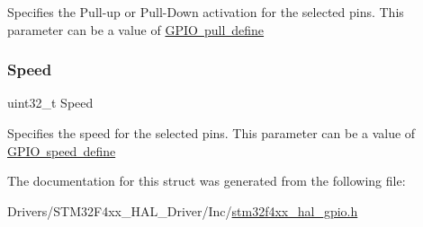 Specifies the Pull-\/up or Pull-\/\+Down activation for the selected pins. This parameter can be a value of \mbox{\hyperlink{group___g_p_i_o__pull__define}{G\+P\+IO pull define}} \mbox{\label{struct_g_p_i_o___init_type_def_ad04b2041f59d32492ec36a891418f3fd}} 
\subsubsection{\texorpdfstring{Speed}{Speed}}
{\footnotesize\ttfamily uint32\+\_\+t Speed}

Specifies the speed for the selected pins. This parameter can be a value of \mbox{\hyperlink{group___g_p_i_o__speed__define}{G\+P\+IO speed define}} 

The documentation for this struct was generated from the following file\+:\begin{DoxyCompactItemize}
\item 
Drivers/\+S\+T\+M32\+F4xx\+\_\+\+H\+A\+L\+\_\+\+Driver/\+Inc/\mbox{\hyperlink{stm32f4xx__hal__gpio_8h}{stm32f4xx\+\_\+hal\+\_\+gpio.\+h}}\end{DoxyCompactItemize}

